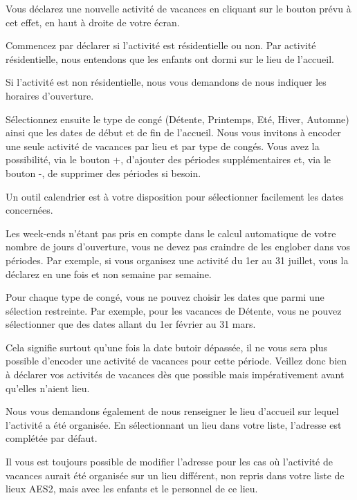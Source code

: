 Vous déclarez une nouvelle activité de vacances en cliquant sur le bouton prévu à cet effet, en haut à droite de votre écran.

Commencez par déclarer si l’activité est résidentielle ou non. Par activité résidentielle, nous entendons que les enfants ont dormi sur le lieu de l’accueil.

Si l’activité est non résidentielle, nous vous demandons de nous indiquer les horaires d’ouverture.

Sélectionnez ensuite le type de congé (Détente, Printemps, Eté, Hiver, Automne) ainsi que les dates de début et de fin de l’accueil.
Nous vous invitons à encoder une seule activité de vacances par lieu et par type de congés. Vous avez la possibilité, via le bouton +, d’ajouter des périodes supplémentaires et, via le bouton -, de supprimer des périodes si besoin.

\begin{info}
Un outil calendrier est à votre disposition pour sélectionner facilement les dates concernées. 
\end{info}


Les week-ends n’étant pas pris en compte dans le calcul automatique de votre nombre de jours d’ouverture, vous ne devez pas craindre de les englober dans vos périodes. Par exemple, si vous organisez une activité du 1er au 31 juillet, vous la déclarez en une fois et non semaine par semaine. 

Pour chaque type de congé, vous ne pouvez choisir les dates que parmi une sélection restreinte. Par exemple, pour les vacances de Détente, vous ne pouvez sélectionner que des dates allant du 1er février au 31 mars.

\begin{attention}
Cela signifie surtout qu’une fois la date butoir dépassée, il ne vous sera plus possible d’encoder une activité de vacances pour cette période. Veillez donc bien à déclarer vos activités de vacances dès que possible mais impérativement avant qu’elles n’aient lieu.
\end{attention}

Nous vous demandons également de nous renseigner le lieu d’accueil sur lequel l’activité a été organisée.
En sélectionnant un lieu dans votre liste, l’adresse est complétée par défaut.

\begin{remarque} Il vous est toujours possible de modifier l’adresse pour les cas où l’activité de vacances aurait été organisée sur un lieu différent, non repris dans votre liste de lieux AES2, mais avec les enfants et le personnel de ce lieu.
\end{remarque}

